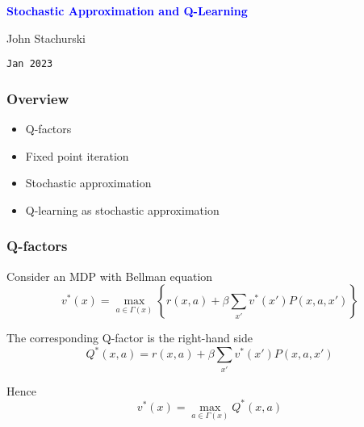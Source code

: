 \documentclass[xcolor=dvipsnames]{beamer}  %
\newcommand{\navy}[1]{\textcolor{blue}{\bf #1}}
\newcommand{\1}{\mathbbm 1}
\begin{document}


\begin{frame}
    
    \begin{center}
        \navy{\Large{Stochastic Approximation and Q-Learning}}

        
        \vspace{2em}
        John Stachurski 

        \vspace{1em}
        \vspace{1em}
        \texttt{Jan 2023}

    \end{center}

\end{frame}

\begin{frame}
    \frametitle{Overview}
    
    \begin{itemize}
        \item Q-factors
        \item Fixed point iteration
        \item Stochastic approximation
        \item Q-learning as stochastic approximation
    \end{itemize}

\end{frame}


\begin{frame}
    \frametitle{Q-factors}

    Consider an MDP with Bellman equation
    \begin{equation*}
        v^*(x) = \max_{a \in \Gamma(x)}
        \left\{
            r(x,a) + \beta \sum_{x'} v^*(x') P(x,a,x')
        \right\}
    \end{equation*}

    The corresponding Q-factor is the right-hand side
    \begin{equation*}
        Q^*(x,a) = r(x,a) + \beta \sum_{x'} v^*(x') P(x,a,x')
    \end{equation*}

    Hence
    \begin{equation*}
        v^*(x)  = \max_{a \in \Gamma(x)} Q^*(x,a)
    \end{equation*}

\end{frame}
\end{document}
